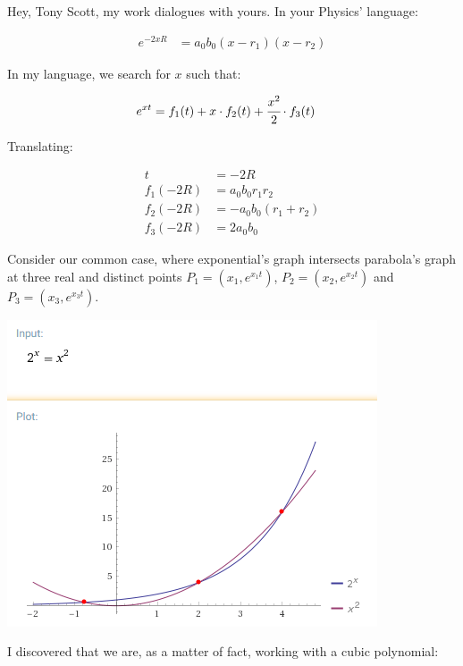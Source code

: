 \documentclass[10pt,a4paper]{article}
\begin{document}
Hey, Tony Scott, my work dialogues with yours. In your Physics' language:

\begin{align}
  e^{-2xR} &= a_0 b_0 (x - r_1) (x - r_2)
\end{align}

In my language, we search for $x$ such that:

\begin{align}
  e^{xt} &= f_1(t) + x \cdot f_2(t) + \cfrac{x^2}{2} \cdot f_3(t)
\end{align}

Translating:

\begin{align}
  t &= -2R \\
  f_1(-2R) &= a_0 b_0 r_1 r_2 \\
  f_2(-2R) &= - a_0 b_0 (r_1 + r_2) \\
  f_3(-2R) &= 2 a_0 b_0
\end{align}

Consider our common case, where exponential's graph intersects parabola's graph at three real and distinct points $P_1 = (x_1, e^{x_1 t})$, $P_2 = (x_2, e^{x_2 t})$ and $P_3 = (x_3, e^{x_3 t})$.

		\begin{center}
		\includegraphics{2xx2}
		\end{center}

I discovered that we are, as a matter of fact, working with a cubic polynomial:
\end{document}
